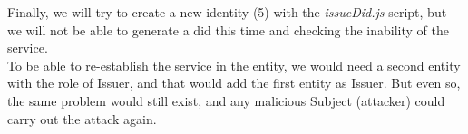 Finally, we will try to create a new identity (5) with the \textit{issueDid.js} script, but we will not be able to generate a \acrshort{did} this time and checking the inability of the service.\\

To be able to re-establish the service in the entity, we would need a second entity with the role of Issuer, and that would add the first entity as Issuer. But even so, the same problem would still exist, and any malicious Subject (attacker) could carry out the attack again.
